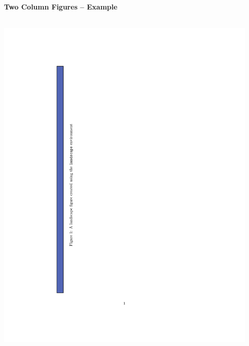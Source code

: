 \documentclass[article]{beamer}
\begin{document}
\begin{frame}
  \frametitle{\thesubsection}
  \framesubtitle{Two Column Figures -- Example}
  \begin{columns}
    \begin{column}{0.5\textwidth}
      \colorbox{white}{\includegraphics[height=0.9\textheight]{landscape_example.pdf}}
    \end{column}
    \begin{column}{0.5\textwidth}

\end{column}
\end{columns}
\end{frame}
\end{document}
